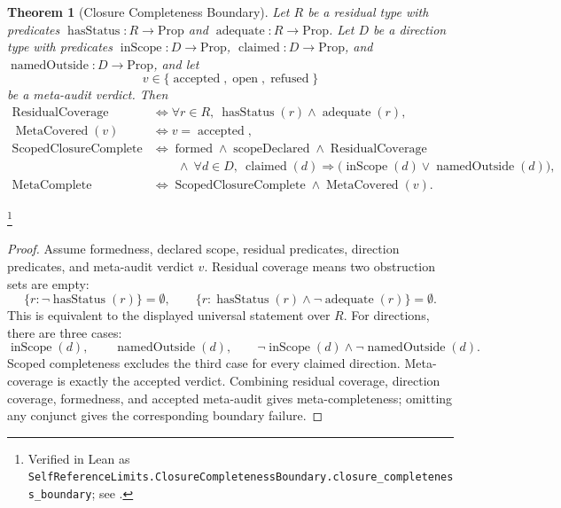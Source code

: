 \documentclass[11pt]{article}
\newtheorem{theorem}{Theorem}[section]
\theoremstyle{definition}
\begin{document}
\begin{theorem}[Closure Completeness Boundary]\label{thm:F52}
Let \(R\) be a residual type with predicates
\(\operatorname{hasStatus}:R\to\mathrm{Prop}\) and
\(\operatorname{adequate}:R\to\mathrm{Prop}\). Let \(D\) be a direction
type with predicates \(\operatorname{inScope}:D\to\mathrm{Prop}\),
\(\operatorname{claimed}:D\to\mathrm{Prop}\), and
\(\operatorname{namedOutside}:D\to\mathrm{Prop}\), and let
\[
  v\in\{\operatorname{accepted},\operatorname{open},\operatorname{refused}\}
\]
be a meta-audit verdict. Then
\begin{align*}
  \operatorname{ResidualCoverage}
  &\iff
  \forall r\in R,\ \operatorname{hasStatus}(r)\wedge\operatorname{adequate}(r),\\
  \operatorname{MetaCovered}(v)
  &\iff v=\operatorname{accepted},\\
  \operatorname{ScopedClosureComplete}
  &\iff
  \operatorname{formed}\wedge\operatorname{scopeDeclared}\wedge
  \operatorname{ResidualCoverage}\\
  &\qquad\wedge\
  \forall d\in D,\ \operatorname{claimed}(d)\Rightarrow
    \bigl(\operatorname{inScope}(d)\vee\operatorname{namedOutside}(d)\bigr),\\
  \operatorname{MetaComplete}
  &\iff \operatorname{ScopedClosureComplete}\wedge\operatorname{MetaCovered}(v).
\end{align*}
\end{theorem}
\footnote{\raggedright Verified in Lean as
\texttt{SelfReferenceLimits.\allowbreak{}ClosureCompletenessBoundary.\allowbreak{}closure\_completeness\_boundary};
see \Cref{app:formalization}.}
\begin{proof}
Assume formedness, declared scope, residual predicates, direction
predicates, and meta-audit verdict \(v\). Residual coverage means two
obstruction sets are empty:
\[
  \{r:\neg\operatorname{hasStatus}(r)\}=\emptyset,
  \qquad
  \{r:\operatorname{hasStatus}(r)\wedge\neg\operatorname{adequate}(r)\}
  =\emptyset .
\]
This is equivalent to the displayed universal statement over \(R\).
For directions, there are three cases:
\[
  \operatorname{inScope}(d),\qquad
  \operatorname{namedOutside}(d),\qquad
  \neg\operatorname{inScope}(d)\wedge\neg\operatorname{namedOutside}(d).
\]
Scoped completeness excludes the third case for every claimed
direction. Meta-coverage is exactly the accepted verdict. Combining
residual coverage, direction coverage, formedness, and accepted
meta-audit gives meta-completeness; omitting any conjunct gives the
corresponding boundary failure.
\end{proof}
\end{document}
